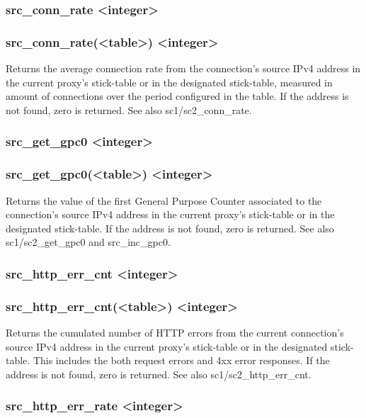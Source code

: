 \subsubsection[src\_conn\_rate]{src\_conn\_rate <integer>}
\subsubsection*{src\_conn\_rate(<table>) <integer>}
  Returns the average connection rate from the connection's source IPv4 address
  in the current proxy's stick-table or in the designated stick-table, measured
  in amount of connections over the period configured in the table. If the
  address is not found, zero is returned. See also sc1/sc2\_conn\_rate.

\subsubsection[src\_get\_gpc0]{src\_get\_gpc0 <integer>}
\subsubsection*{src\_get\_gpc0(<table>) <integer>}
  Returns the value of the first General Purpose Counter associated to the
  connection's source IPv4 address in the current proxy's stick-table or in
  the designated stick-table. If the address is not found, zero is returned.
  See also sc1/sc2\_get\_gpc0 and src\_inc\_gpc0.

\subsubsection[src\_http\_err\_cnt]{src\_http\_err\_cnt <integer>}
\subsubsection*{src\_http\_err\_cnt(<table>) <integer>}
  Returns the cumulated number of HTTP errors from the current connection's
  source IPv4 address in the current proxy's stick-table or in the designated
  stick-table. This includes the both request errors and 4xx error responses.
  If the address is not found, zero is returned. See also sc1/sc2\_http\_err\_cnt.

\subsubsection[src\_http\_err\_rate]{src\_http\_err\_rate <integer>}
